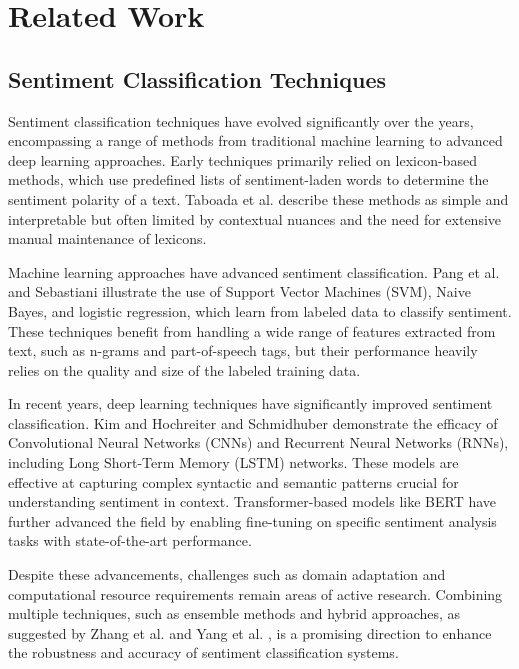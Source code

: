 \section{Related Work}
\label{Related Work}


\subsection{Sentiment Classification Techniques}

Sentiment classification techniques have evolved significantly over the years, encompassing a range of methods from traditional machine learning to advanced deep learning approaches. Early techniques primarily relied on lexicon-based methods, which use predefined lists of sentiment-laden words to determine the sentiment polarity of a text. Taboada et al. \cite{taboada2011lexicon} describe these methods as simple and interpretable but often limited by contextual nuances and the need for extensive manual maintenance of lexicons.

Machine learning approaches have advanced sentiment classification. Pang et al. \cite{pang2002thumbs} and Sebastiani \cite{sebastiani2002machine} illustrate the use of Support Vector Machines (SVM), Naive Bayes, and logistic regression, which learn from labeled data to classify sentiment. These techniques benefit from handling a wide range of features extracted from text, such as n-grams and part-of-speech tags, but their performance heavily relies on the quality and size of the labeled training data.

In recent years, deep learning techniques have significantly improved sentiment classification. Kim \cite{kim2014convolutional} and Hochreiter and Schmidhuber \cite{hochreiter1997long} demonstrate the efficacy of Convolutional Neural Networks (CNNs) and Recurrent Neural Networks (RNNs), including Long Short-Term Memory (LSTM) networks. These models are effective at capturing complex syntactic and semantic patterns crucial for understanding sentiment in context. Transformer-based models like BERT \cite{devlin2018bert} have further advanced the field by enabling fine-tuning on specific sentiment analysis tasks with state-of-the-art performance. 


Despite these advancements, challenges such as domain adaptation and computational resource requirements remain areas of active research. Combining multiple techniques, such as ensemble methods and hybrid approaches, as suggested by Zhang et al. \cite{zhang2018deep} and Yang et al. \cite{yang2019xlnet}, is a promising direction to enhance the robustness and accuracy of sentiment classification systems.



